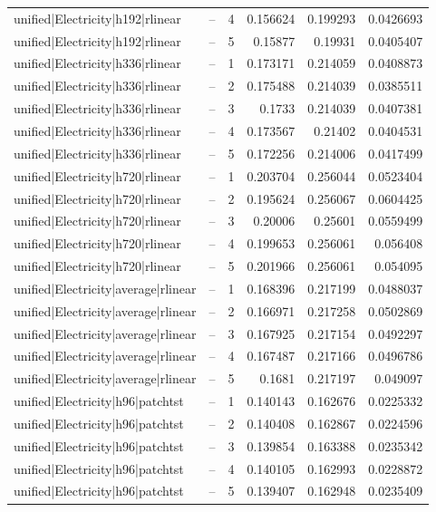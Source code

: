 \begin{longtable}{llrrrr}
unified|Electricity|h192|rlinear & -- & 4 & 0.156624 & 0.199293 & 0.0426693 \\
unified|Electricity|h192|rlinear & -- & 5 & 0.15877 & 0.19931 & 0.0405407 \\
unified|Electricity|h336|rlinear & -- & 1 & 0.173171 & 0.214059 & 0.0408873 \\
unified|Electricity|h336|rlinear & -- & 2 & 0.175488 & 0.214039 & 0.0385511 \\
unified|Electricity|h336|rlinear & -- & 3 & 0.1733 & 0.214039 & 0.0407381 \\
unified|Electricity|h336|rlinear & -- & 4 & 0.173567 & 0.21402 & 0.0404531 \\
unified|Electricity|h336|rlinear & -- & 5 & 0.172256 & 0.214006 & 0.0417499 \\
unified|Electricity|h720|rlinear & -- & 1 & 0.203704 & 0.256044 & 0.0523404 \\
unified|Electricity|h720|rlinear & -- & 2 & 0.195624 & 0.256067 & 0.0604425 \\
unified|Electricity|h720|rlinear & -- & 3 & 0.20006 & 0.25601 & 0.0559499 \\
unified|Electricity|h720|rlinear & -- & 4 & 0.199653 & 0.256061 & 0.056408 \\
unified|Electricity|h720|rlinear & -- & 5 & 0.201966 & 0.256061 & 0.054095 \\
unified|Electricity|average|rlinear & -- & 1 & 0.168396 & 0.217199 & 0.0488037 \\
unified|Electricity|average|rlinear & -- & 2 & 0.166971 & 0.217258 & 0.0502869 \\
unified|Electricity|average|rlinear & -- & 3 & 0.167925 & 0.217154 & 0.0492297 \\
unified|Electricity|average|rlinear & -- & 4 & 0.167487 & 0.217166 & 0.0496786 \\
unified|Electricity|average|rlinear & -- & 5 & 0.1681 & 0.217197 & 0.049097 \\
unified|Electricity|h96|patchtst & -- & 1 & 0.140143 & 0.162676 & 0.0225332 \\
unified|Electricity|h96|patchtst & -- & 2 & 0.140408 & 0.162867 & 0.0224596 \\
unified|Electricity|h96|patchtst & -- & 3 & 0.139854 & 0.163388 & 0.0235342 \\
unified|Electricity|h96|patchtst & -- & 4 & 0.140105 & 0.162993 & 0.0228872 \\
unified|Electricity|h96|patchtst & -- & 5 & 0.139407 & 0.162948 & 0.0235409 \\

\end{longtable}
